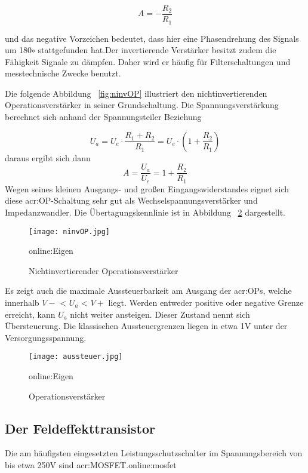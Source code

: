 \begin{equation}
	\label{equ:bsp1}
	A = - \frac{R_{2}}{R_{1}}
\end{equation}

und das negative Vorzeichen bedeutet, dass hier eine Phasendrehung des Signals um 180$\circ$ stattgefunden hat.Der invertierende Verstärker besitzt zudem die Fähigkeit Signale zu dämpfen. Daher wird er häufig für Filterschaltungen und messtechnische Zwecke benutzt. 

Die folgende Abbildung ~\ref{fig:ninvOP} illustriert den nichtinvertierenden Operationsverstärker in seiner Grundschaltung. Die Spannungsverstärkung berechnet sich anhand der Spannungsteiler Beziehung

\begin{equation}
	\label{equ:bsp1}
	U_{a} = U_{e} \cdot \frac{R_{1} + R_{2}}{R_{1}} = U_{e} \cdot (1+ \frac{R_{2}}{R_{1}})
\end{equation}
daraus ergibt sich dann
\begin{equation}
	\label{equ:bsp1}
	A = \frac{U_{a}}{U_{e}} = 1+ \frac{R_{2}}{R_{1}}
\end{equation}
Wegen seines kleinen Ausgangs- und großen Eingangswiderstandes eignet sich diese \gls{acr:OP}-Schaltung sehr gut als  Wechselspannungsverstärker und Impedanzwandler. Die Übertagungskennlinie ist in Abbildung ~\ref{fig:aussteuer} dargestellt. 

\begin{figure}[H]
	\centering
	\texttt{[image: ninvOP.jpg]}
	\caption[Nichtinvertierender Operationsverstärker]{Nichtinvertierender Operationsverstärker} 
	\gls{online:Eigen}
	\label{fig:invOP}
\end{figure}

Es zeigt auch die maximale Aussteuerbarkeit am Ausgang der \gls{acr:OP}s, welche innerhalb $V-$ < $U_{a}$ < $V+$ liegt. Werden entweder positive oder negative Grenze erreicht, kann $U_{a}$ nicht weiter ansteigen. Dieser Zustand nennt sich Übersteuerung. Die klassischen Aussteuergrenzen liegen in etwa 1V unter der Versorgungsspannung.\cite{federauOperationsverstaerker2017}

\begin{figure}[H]
	\centering
	\texttt{[image: aussteuer.jpg]}
	\caption[Operationsverstärker]{Operationsverstärker} 
	\gls{online:Eigen}
	\label{fig:aussteuer}
\end{figure} 

\newpage
\subsection{Der Feldeffekttransistor}
\label{subsec:Unterabschnitt12}
Die am häufigsten eingesetzten Leistungsschutzschalter im Spannungsbereich von bis etwa 250V sind \gls{acr:MOSFET}.\gls{online:mosfet}


